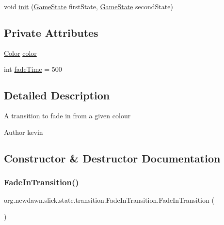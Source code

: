 \begin{DoxyCompactItemize}
\item 
void \mbox{\hyperlink{classorg_1_1newdawn_1_1slick_1_1state_1_1transition_1_1_fade_in_transition_ab2f9be16d067c2b63f3093cd93fbe2aa}{init}} (\mbox{\hyperlink{interfaceorg_1_1newdawn_1_1slick_1_1state_1_1_game_state}{Game\+State}} first\+State, \mbox{\hyperlink{interfaceorg_1_1newdawn_1_1slick_1_1state_1_1_game_state}{Game\+State}} second\+State)
\end{DoxyCompactItemize}
\subsection*{Private Attributes}
\begin{DoxyCompactItemize}
\item 
\mbox{\hyperlink{classorg_1_1newdawn_1_1slick_1_1_color}{Color}} \mbox{\hyperlink{classorg_1_1newdawn_1_1slick_1_1state_1_1transition_1_1_fade_in_transition_afaaf133a75453117cbd4250e93f375fc}{color}}
\item 
int \mbox{\hyperlink{classorg_1_1newdawn_1_1slick_1_1state_1_1transition_1_1_fade_in_transition_af06dd5e9b2e7da8c3f38d2da3e54e435}{fade\+Time}} = 500
\end{DoxyCompactItemize}


\subsection{Detailed Description}
A transition to fade in from a given colour

\begin{DoxyAuthor}{Author}
kevin 
\end{DoxyAuthor}


\subsection{Constructor \& Destructor Documentation}
\mbox{\label{classorg_1_1newdawn_1_1slick_1_1state_1_1transition_1_1_fade_in_transition_ad0160e08d177504d05b16ed947a3bbc2}} 
\subsubsection{\texorpdfstring{Fade\+In\+Transition()}{FadeInTransition()}\hspace{0.1cm}{\footnotesize\ttfamily [1/3]}}
{\footnotesize\ttfamily org.\+newdawn.\+slick.\+state.\+transition.\+Fade\+In\+Transition.\+Fade\+In\+Transition (\begin{DoxyParamCaption}{ }\end{DoxyParamCaption})\hspace{0.3cm}{\ttfamily [inline]}}

